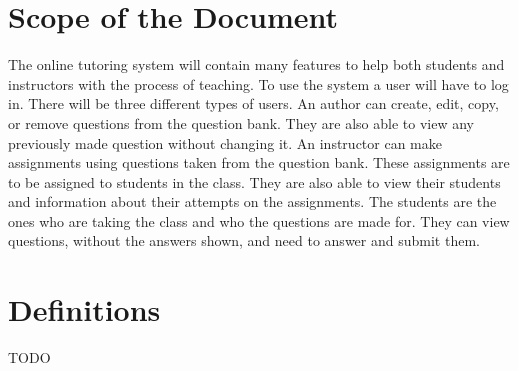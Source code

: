 \chapter{Scope of the Document}
The online tutoring system will contain many features to help both students and instructors with the process of teaching. To use the system a user will have to log in. There will be three different types of users. An author can create, edit, copy, or remove questions from the question bank. They are also able to view any previously made question without changing it. An instructor can make assignments using questions taken from the question bank. These assignments are to be assigned to students in the class. They are also able to view their students and information about their attempts on the assignments. The students are the ones who are taking the class and who the questions are made for. They can view questions, without the answers shown, and need to answer and submit them.

\chapter{Definitions}
TODO
